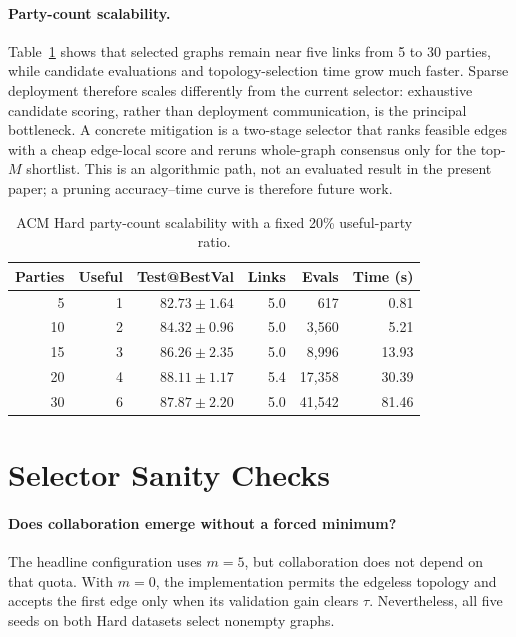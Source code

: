 \documentclass[letterpaper]{article}
\begin{document}
\paragraph{Party-count scalability.}
Table~\ref{tab:supp-scalability} shows that selected graphs remain near five
links from 5 to 30 parties, while candidate evaluations and topology-selection
time grow much faster. Sparse deployment therefore scales differently from the
current selector: exhaustive candidate scoring, rather than deployment
communication, is the principal bottleneck. A concrete mitigation is a
two-stage selector that ranks feasible edges with a cheap edge-local score and
reruns whole-graph consensus only for the top-$M$ shortlist. This is an
algorithmic path, not an evaluated result in the present paper; a pruning
accuracy--time curve is therefore future work.

\begin{table}[!t]
\centering
\footnotesize
\caption{ACM Hard party-count scalability with a fixed 20\% useful-party ratio.}
\label{tab:supp-scalability}
\begin{tabular}{rrrrrr}
\toprule
Parties & Useful & Test@BestVal & Links & Evals & Time (s) \\
\midrule
5  & 1 & $82.73\pm1.64$ & 5.0 & 617 & 0.81 \\
10 & 2 & $84.32\pm0.96$ & 5.0 & 3,560 & 5.21 \\
15 & 3 & $86.26\pm2.35$ & 5.0 & 8,996 & 13.93 \\
20 & 4 & $88.11\pm1.17$ & 5.4 & 17,358 & 30.39 \\
30 & 6 & $87.87\pm2.20$ & 5.0 & 41,542 & 81.46 \\
\bottomrule
\end{tabular}
\end{table}

\section{Selector Sanity Checks}

\paragraph{Does collaboration emerge without a forced minimum?}
The headline configuration uses $m=5$, but collaboration does not depend on
that quota. With $m=0$, the implementation permits the edgeless topology and
accepts the first edge only when its validation gain clears $\tau$. Nevertheless,
all five seeds on both Hard datasets select nonempty graphs.
\end{document}
